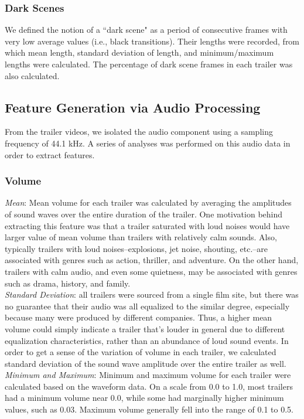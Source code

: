\documentclass[letterpaper, 10 pt, conference]{ieeeconf}  %
\begin{document}
\subsubsection{Dark Scenes}
We defined the notion of a ``dark scene" as a period of consecutive frames with very low average values (i.e., black transitions). Their lengths were recorded, from which mean length, standard deviation of length, and minimum/maximum lengths were calculated. The percentage of dark scene frames in each trailer was also calculated. 

\subsection{Feature Generation via Audio Processing}
From the trailer videos, we isolated the audio component using a sampling frequency of 44.1 kHz. A series of analyses was performed on this audio data in order to extract features.

\subsubsection{Volume}
\textit{Mean}: Mean volume for each trailer was calculated by averaging the amplitudes of sound waves over the entire duration of the trailer. One motivation behind extracting this feature was that a trailer saturated with loud noises would have larger value of mean volume than trailers with relatively calm sounds. Also, typically trailers with loud noises--explosions, jet noise, shouting, etc.--are associated with genres such as action, thriller, and adventure. On the other hand, trailers with calm audio, and even some quietness, may be associated with genres such as drama, history, and family. \\

\textit{Standard Deviation}: all trailers were sourced from a single film site, but there was no guarantee that their audio was all equalized to the similar degree, especially because many were produced by different companies. Thus, a higher mean volume could simply indicate a trailer that's louder in general due to different equalization characteristics, rather than an abundance of loud sound events. In order to get a sense of the variation of volume in each trailer, we calculated standard deviation of the sound wave amplitude over the entire trailer as well.\\

\textit{Minimum and Maximum}: Minimum and maximum volume for each trailer were calculated based on the waveform data. On a scale from 0.0 to 1.0, most trailers had a minimum volume near 0.0, while some had marginally higher minimum values, such as 0.03. Maximum volume generally fell into the range of 0.1 to 0.5.
\end{document}
